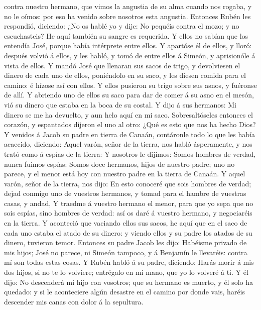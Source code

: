 contra nuestro hermano, que vimos la angustia de su alma cuando nos
rogaba, y no le oímos: por eso ha venido sobre nosotros esta angustia.
 Entonces Rubén les respondió, diciendo: ¿No os hablé yo
y dije: No pequéis contra el mozo; y no escuchasteis? He aquí también su
sangre es requerida.  Y ellos no sabían que los entendía
José, porque había intérprete entre ellos.  Y apartóse él
de ellos, y lloró: después volvió á ellos, y les habló, y tomó de entre
ellos á Simeón, y aprisionóle á vista de ellos.  Y mandó
José que llenaran sus sacos de trigo, y devolviesen el dinero de cada
uno de ellos, poniéndolo en su saco, y les diesen comida para el camino:
é hízose así con ellos.  Y ellos pusieron su trigo sobre
sus asnos, y fuéronse de allí.  Y abriendo uno de ellos
su saco para dar de comer á su asno en el mesón, vió su dinero que
estaba en la boca de su costal.  Y dijo á sus hermanos:
Mi dinero se me ha devuelto, y aun helo aquí en mi saco. Sobresaltóseles
entonces el corazón, y espantados dijeron el uno al otro: ¿Qué es esto
que nos ha hecho Dios?  Y venidos á Jacob su padre en
tierra de Canaán, contáronle todo lo que les había acaecido, diciendo:
 Aquel varón, señor de la tierra, nos habló ásperamente,
y nos trató como á espías de la tierra:  Y nosotros le
dijimos: Somos hombres de verdad, nunca fuimos espías: 
Somos doce hermanos, hijos de nuestro padre; uno no parece, y el menor
está hoy con nuestro padre en la tierra de Canaán.  Y
aquel varón, señor de la tierra, nos dijo: En esto conoceré que sois
hombres de verdad; dejad conmigo uno de vuestros hermanos, y tomad para
el hambre de vuestras casas, y andad,  Y traedme á
vuestro hermano el menor, para que yo sepa que no sois espías, sino
hombres de verdad: así os daré á vuestro hermano, y negociaréis en la
tierra.  Y aconteció que vaciando ellos sus sacos, he
aquí que en el saco de cada uno estaba el atado de su dinero: y viendo
ellos y su padre los atados de su dinero, tuvieron temor.
 Entonces su padre Jacob les dijo: Habéisme privado de
mis hijos; José no parece, ni Simeón tampoco, y á Benjamín le llevaréis:
contra mí son todas estas cosas.  Y Rubén habló á su
padre, diciendo: Harás morir á mis dos hijos, si no te lo volviere;
entrégalo en mi mano, que yo lo volveré á ti.  Y él dijo:
No descenderá mi hijo con vosotros; que su hermano es muerto, y él solo
ha quedado: y si le aconteciere algún desastre en el camino por donde
vais, haréis descender mis canas con dolor á la sepultura.

